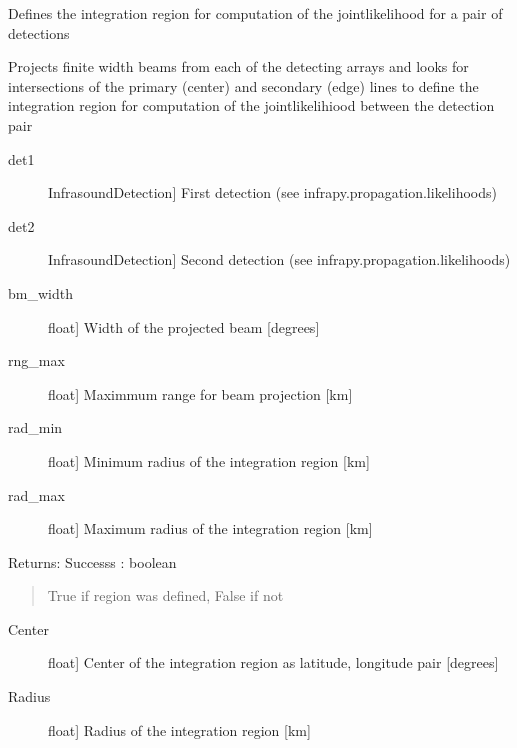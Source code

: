 \documentclass[letterpaper,10pt,english]{sphinxmanual}
\begin{document}
\begin{fulllineitems}
\label{\detokenize{infrapy.association:infrapy.association.hjl.set_region}}
Defines the integration region for computation of the joint\sphinxhyphen{}likelihood for a pair of detections

Projects finite width beams from each of the detecting arrays and looks for intersections
of the primary (center) and secondary (edge) lines to define the integration region
for computation of the joint\sphinxhyphen{}likelihiood between the detection pair
\begin{description}
\item[{det1}] \leavevmode{[}InfrasoundDetection{]}
First detection (see infrapy.propagation.likelihoods)

\item[{det2}] \leavevmode{[}InfrasoundDetection{]}
Second detection (see infrapy.propagation.likelihoods)

\item[{bm\_width}] \leavevmode{[}float{]}
Width of the projected beam {[}degrees{]}

\item[{rng\_max}] \leavevmode{[}float{]}
Maximmum range for beam projection {[}km{]}

\item[{rad\_min}] \leavevmode{[}float{]}
Minimum radius of the integration region {[}km{]}

\item[{rad\_max}] \leavevmode{[}float{]}
Maximum radius of the integration region {[}km{]}

\end{description}

Returns:
Successs : boolean
\begin{quote}

True if region was defined, False if not
\end{quote}
\begin{description}
\item[{Center}] \leavevmode{[}float{]}
Center of the integration region as latitude, longitude pair {[}degrees{]}

\item[{Radius}] \leavevmode{[}float{]}
Radius of the integration region {[}km{]}

\end{description}

\end{fulllineitems}
\end{document}
